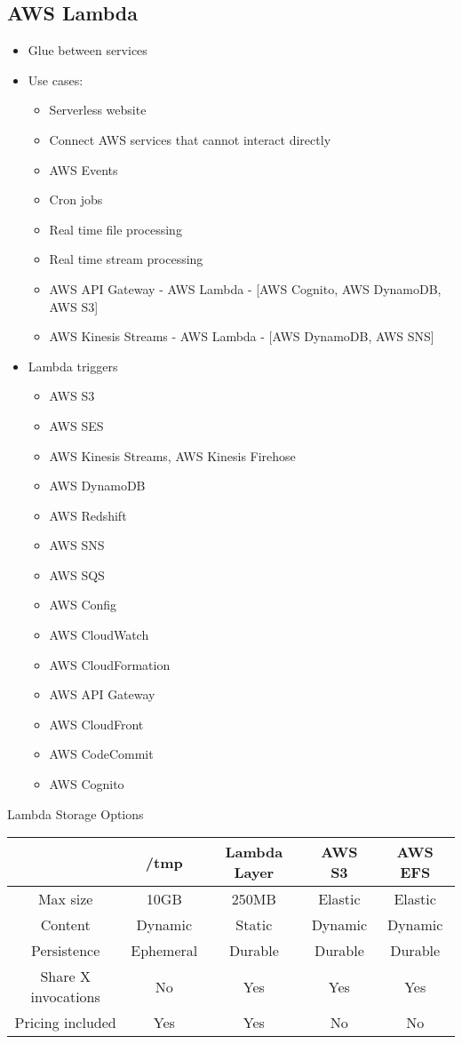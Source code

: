 \documentclass[../../main.tex]{subfiles}
\begin{document}
\subsection{AWS Lambda}
\begin{itemize}
    \item Glue between services
    \item Use cases:
    \begin{itemize}
        \item Serverless website
        \item Connect AWS services that cannot interact directly
        \item AWS Events
        \item Cron jobs
        \item Real time file processing
        \item Real time stream processing
        \item AWS API Gateway - AWS Lambda - [AWS Cognito, AWS DynamoDB, AWS S3]
        \item AWS Kinesis Streams - AWS Lambda - [AWS DynamoDB, AWS SNS]
    \end{itemize}
    \item Lambda triggers
    \begin{itemize}
        \item AWS S3
        \item AWS SES
        \item AWS Kinesis Streams, AWS Kinesis Firehose
        \item AWS DynamoDB
        \item AWS Redshift
        \item AWS SNS
        \item AWS SQS
        \item AWS Config
        \item AWS CloudWatch
        \item AWS CloudFormation
        \item AWS API Gateway
        \item AWS CloudFront
        \item AWS CodeCommit
        \item AWS Cognito
    \end{itemize}
\end{itemize}

Lambda Storage Options
\begin{center}
    \begin{tabular}{ |c|c|c|c|c| }
    \hline
    & /tmp & Lambda Layer & AWS S3 & AWS EFS \\
    \hline
    \hline
    Max size & 10GB & 250MB & Elastic & Elastic \\
    \hline
    Content & Dynamic & Static & Dynamic & Dynamic \\
    \hline
    Persistence & Ephemeral & Durable & Durable & Durable \\
    \hline
    Share X invocations & No & Yes & Yes & Yes\\
    \hline
    Pricing included & Yes & Yes & No & No \\
    \hline
    \end{tabular}
\end{center}
\end{document}

